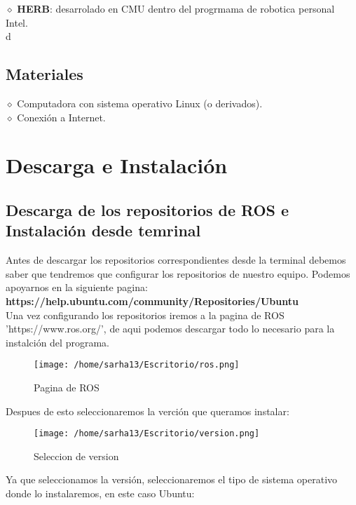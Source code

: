 \documentclass[letter,openrigth,12pt,spanish]{report}
\begin{document}
$\diamond$ \textbf{HERB}: desarrolado en CMU dentro del progrmama de robotica personal Intel.\\
d
\subsection{Materiales}

$\diamond$ Computadora con sistema operativo Linux (o derivados).\\

$\diamond$ Conexi\'on a Internet.\\
 
\section{Descarga e Instalaci\'on}

\subsection{Descarga de los repositorios de ROS e Instalaci\'on desde temrinal}

Antes de descargar los repositorios correspondientes desde la terminal debemos saber que tendremos que configurar los repositorios de nuestro equipo. Podemos apoyarnos en la siguiente pagina:\\

\textbf{https://help.ubuntu.com/community/Repositories/Ubuntu}\\

Una vez configurando los repositorios iremos a la pagina de ROS 'https://www.ros.org/', de aqui podemos descargar todo lo necesario para la instalci\'on del programa.\\

\begin{figure}[htp]
\centering
\texttt{[image: /home/sarha13/Escritorio/ros.png]}
\caption{Pagina de ROS}
\label{Figura 1.}
\end{figure}

Despues de esto seleccionaremos la verci\'on que queramos instalar:\\

\begin{figure}[htp]
\centering
\texttt{[image: /home/sarha13/Escritorio/version.png]}
\caption{Seleccion de version}
\label{FIgura 2.}
\end{figure}

Ya que seleccionamos la versi\'on, seleccionaremos el tipo de sistema operativo donde lo instalaremos, en este caso Ubuntu:\\
\end{document}
